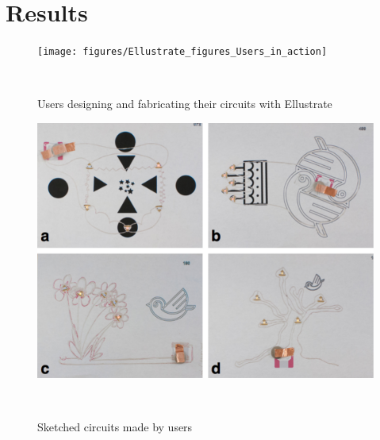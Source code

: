 \documentclass{sigchi}
\begin{document}

\section{Results}


\begin{figure}
\centering
  \texttt{[image: figures/Ellustrate\_figures\_Users\_in\_action]}
  \caption{Users designing and fabricating their circuits with Ellustrate}~\label{fig:users-in-action}
\end{figure}


\begin{figure}
\centering
  \includegraphics[width=1\columnwidth]{figures/Ellustrate_figures_Users_artwork}
  \caption{Sketched circuits made by users}~\label{fig:user-artwork}
\end{figure}
\end{document}
